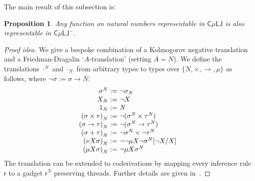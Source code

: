 \documentclass[10pt,a4paper]{amsart}
\theoremstyle{plain}
\newtheorem{proposition}[proposition]{Proposition}
\theoremstyle{definition}
\newcommand{\dfn}{:=}
\newcommand{\anupam}[1]{\todo[color=green]{A: #1}}
\renewcommand{\todo}[1]{}
\renewcommand{\anupam}[1]{}
\theoremstyle{plain}
\theoremstyle{definition} %
\newcommand{\nat}{\mathit{N}}
\newcommand{\N}{\nat} %
\newcommand{\arrow}{\to}
\newcommand{\infrule}{\mathsf{r}}
\newcommand{\rrule}{\infrule} %
\newcommand{\LJ}{\mathsf{LJ}}
\newcommand{\muLJ}{\mu\LJ}
\newcommand{\circular}{\mathsf C}
\newcommand{\cmuLJ}{\circular\muLJ}
\newcommand{\cmuLJneg}{\cmuLJ^-}
\newcommand{\negtrans}[1]{{#1}^{\N}}
\newcommand{\unnegtrans}[1]{{#1}_{\N}}
\newcommand{\negn}{\neg}
\begin{document}
The main result of this subsection is:
\begin{proposition}\label{prop:cmulj-into-cmuljminus}
    Any function on natural numbers representable in $\cmuLJ$ is also representable in $\cmuLJneg$.
\end{proposition}
\begin{proof}
[Proof idea]
We give a bespoke combination of a Kolmogorov negative translation and a Friedman-Dragalin `$A$-translation' (setting $A= \N$). We define the translations $\negtrans \cdot$ and $\unnegtrans \cdot$ from arbitrary types to types over $\{\N,\times, \to , \mu\}$ as follows, where $\lnot \sigma \dfn \sigma \arrow \N$:
\[
\begin{array}{r@{\ := \ }l}
\negtrans \sigma & \neg \unnegtrans \sigma\\ 
\unnegtrans X & \negn X \\
    \unnegtrans 1 & \N \\
    \unnegtrans{(\sigma \times \tau)} & \negn (\negtrans \sigma \times \negtrans \tau) \\
    \unnegtrans{(\sigma \to \tau)} & \neg( \negtrans\sigma \to \negtrans \tau) \\
    \unnegtrans{(\sigma+\tau)} & \neg   \negtrans \sigma \times \neg \negtrans \tau \\
    \unnegtrans{(\nu X \sigma)} & \neg \neg \mu X \negn \negtrans\sigma[\negn X / X] \\
    \unnegtrans{(\mu X \sigma)} &  \neg \mu X \negtrans{\sigma}
\end{array}
\]
The translation can be extended to coderivations by mapping every inference rule $\rrule$ to a gadget $\negtrans \rrule$  preserving threads.
Further details are given in~.
\end{proof}


\end{document}
